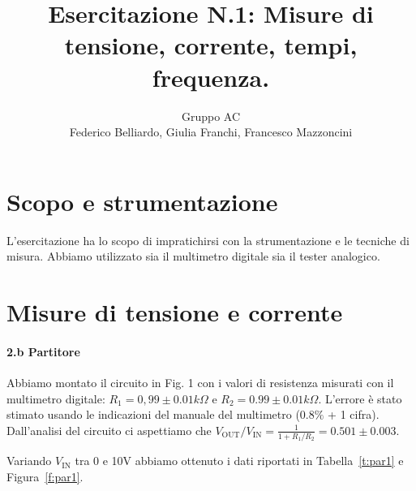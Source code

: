 \documentclass[10pt,a4paper]{article}
\author{Gruppo AC \\ Federico Belliardo, Giulia Franchi, Francesco Mazzoncini}
\title{Esercitazione N.1: Misure di tensione, corrente, tempi, frequenza.}
\begin{document}
\maketitle

\section{Scopo e strumentazione}

L'esercitazione ha lo scopo di impratichirsi con la strumentazione e le tecniche di misura. 
Abbiamo utilizzato sia il multimetro digitale sia il tester analogico. 

\section{Misure di tensione e corrente}
\paragraph{2.b Partitore}
Abbiamo montato il circuito in Fig. 1 con i valori di resistenza misurati con il multimetro digitale: $R_1 = 0,99\pm 0.01 k\Omega$ e $R_2 = 0.99\pm 0.01 k\Omega$. L'errore \`e stato stimato usando le indicazioni del manuale del multimetro ($0.8\%$ + 1 cifra). 
Dall'analisi del circuito ci aspettiamo che $V_\mathrm{OUT}/V_\mathrm{IN} = \frac{1}{1+R_1/R_2}= 0.501 \pm 0.003 $.


Variando $V_\mathrm{IN}$ tra 0 e 10V abbiamo ottenuto i dati riportati in Tabella~\ref{t:par1} e Figura~\ref{f:par1}.
\end{document}
